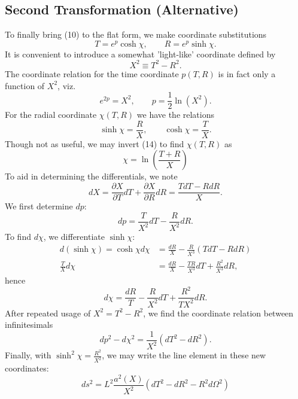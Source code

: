 \documentclass[10pt,letterpaper]{article}
\begin{document}
\subsection*{Second Transformation (Alternative)}
To finally bring (10) to the flat form, we make coordinate substitutions
\begin{equation}
T = e^{p}\cosh \chi,\qquad R = e^{p}\sinh \chi. 
\end{equation}
It is convenient to introduce a somewhat 'light-like' coordinate defined by
\begin{equation}
X^2 \equiv T^2 - R^2.
\end{equation}
The coordinate relation for the time coordinate $p(T,R)$ is in fact only a function of $X^2$, viz.
\begin{equation}
e^{2p} = X^2,\qquad p = \frac12 \ln(X^2).
\end{equation}
For the radial coordinate $\chi(T,R)$ we have the relations
\begin{equation}
\sinh \chi = \frac{R}{X},\qquad \cosh \chi = \frac{T}{X}.
\end{equation}
Though not as useful, we may invert (14) to find $\chi(T,R)$ as
\begin{equation}
\chi = \ln \left( \frac{T+R}{X}\right)
\end{equation}
To aid in determining the differentials, we note
\begin{equation}
dX = \frac{\partial X}{\partial T}dT + \frac{\partial X}{\partial R} dR= \frac{TdT - RdR}{X}.
\end{equation}
We first determine $dp$:
\begin{equation}
dp =\frac{ T}{X^2}dT - \frac{R}{X^2}dR.
\end{equation}
To find $d\chi$, we differentiate $\sinh \chi$:
\begin{align}
d(\sinh \chi) = \cosh \chi d\chi &= \frac{dR}{X} -\frac{ R }{X^3}(TdT-RdR)\\
\frac{T}{X}d\chi &= \frac{dR}{X} -\frac{TR}{X^{3}}dT + \frac{R^2}{X^{3}} dR,
\end{align}
hence
\begin{equation}
d\chi =\frac{dR}{T} - \frac{R}{X^2}dT +\frac{R^2}{TX^2} dR.
\end{equation}
After repeated usage of $X^2 = T^2- R^2$, we find the coordinate relation between infinitesimals
\begin{equation}
dp^2-d\chi^2 = \frac{1}{X^2}\left( dT^2 - dR^2\right).
\end{equation}
Finally, with $\sinh^2 \chi = \frac{R^2}{X^2}$, we may write the line element in these new coordinates:
\begin{equation}
ds^2 = L^2\frac{a^2(X)}{X^2} \left( dT^2 - dR^2 - R^2 d\Omega^2\right)
\end{equation}
\end{document}
